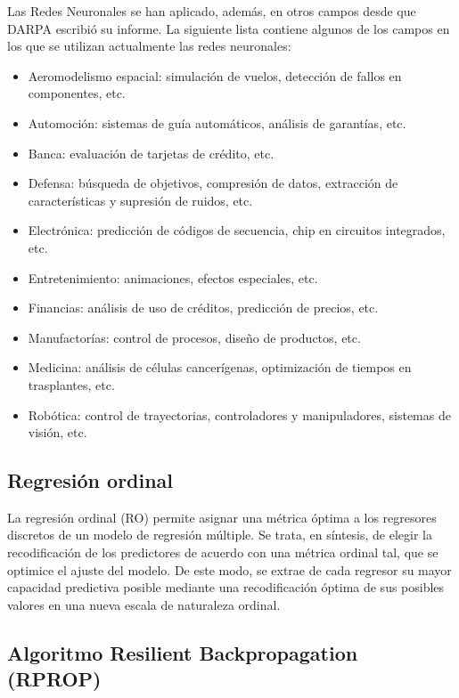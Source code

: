 		Las Redes Neuronales se han aplicado, además, en otros campos desde que DARPA escribió su informe. La siguiente lista contiene algunos de los campos en los que se utilizan actualmente las redes neuronales:
		
		\begin{itemize}
			\item Aeromodelismo espacial: simulación de vuelos, detección de fallos en componentes, etc.
			\item Automoción: sistemas de guía automáticos, análisis de garantías, etc.
			\item Banca: evaluación de tarjetas de crédito, etc.
			\item Defensa: búsqueda de objetivos, compresión de datos, extracción de características y supresión de ruidos, etc.
			\item Electrónica: predicción de códigos de secuencia, chip en circuitos integrados, etc.
			\item Entretenimiento: animaciones, efectos especiales, etc.
			\item Financias: análisis de uso de créditos, predicción de precios, etc.
			\item Manufactorías: control de procesos, diseño de productos, etc.
			\item Medicina: análisis de células cancerígenas, optimización de tiempos en trasplantes, etc.
			\item Robótica: control de trayectorias, controladores y manipuladores, sistemas de visión, etc.
		\end{itemize}
		
		\subsection{Regresión ordinal}
		
			La regresión ordinal (RO) permite asignar una métrica óptima a los regresores discretos de un modelo de regresión múltiple. Se trata, en síntesis, de elegir la recodificación de los predictores de acuerdo con una métrica ordinal tal, que se optimice el ajuste del modelo. De este modo, se extrae de cada regresor su mayor capacidad predictiva posible mediante una recodificación óptima de sus posibles valores en una nueva escala de naturaleza ordinal.
			
		\subsection{Algoritmo Resilient Backpropagation (RPROP)}
	
